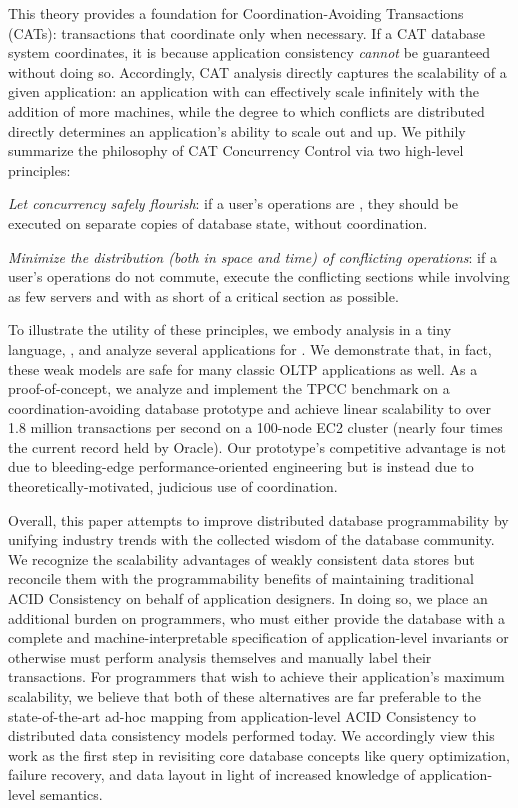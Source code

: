 This theory provides a foundation for Coordination-Avoiding
Transactions (CATs): transactions that coordinate only when necessary.
If a CAT database system coordinates, it is because application
consistency \textit{cannot} be guaranteed without doing
so. Accordingly, CAT analysis directly captures the scalability of a
given application: an application with \cfreedom can
effectively scale infinitely with the addition of more machines, while
the degree to which conflicts are distributed directly determines an
application's ability to scale out and up. We pithily summarize the
philosophy of CAT Concurrency Control via two high-level principles:
\begin{introenumerate}
\item \textit{Let concurrency safely flourish}: if a user's operations
  are \iconfluent, they should be executed on separate copies of
  database state, without coordination.
\item \textit{Minimize the distribution (both in space and time) of
  conflicting operations}: if a user's operations do not commute,
  execute the conflicting sections while involving as few servers and
  with as short of a critical section as possible.
\end{introenumerate}
To illustrate the utility of these principles, we embody \iconfluence
analysis in a tiny language, \lang, and analyze several applications
for \cfreedom. We demonstrate that, in fact, these weak models are
safe for many classic OLTP applications as well. As a
proof-of-concept, we analyze and implement the TPCC benchmark on a
coordination-avoiding database prototype and achieve linear
scalability to over 1.8 million transactions per second on a 100-node
EC2 cluster (nearly four times the current record held by Oracle). Our
prototype's competitive advantage is not due to bleeding-edge
performance-oriented engineering but is instead due to
theoretically-motivated, judicious use of coordination.

Overall, this paper attempts to improve distributed database
programmability by unifying industry trends with the collected wisdom
of the database community. We recognize the scalability advantages of
weakly consistent data stores but reconcile them with the
programmability benefits of maintaining traditional ACID Consistency
on behalf of application designers. In doing so, we place an
additional burden on programmers, who must either provide the database
with a complete and machine-interpretable specification of
application-level invariants or otherwise must perform analysis
themselves and manually label their transactions. For programmers that
wish to achieve their application's maximum scalability, we believe
that both of these alternatives are far preferable to the
state-of-the-art ad-hoc mapping from application-level ACID
Consistency to distributed data consistency models performed today. We
accordingly view this work as the first step in revisiting core
database concepts like query optimization, failure recovery, and data
layout in light of increased knowledge of application-level semantics.
